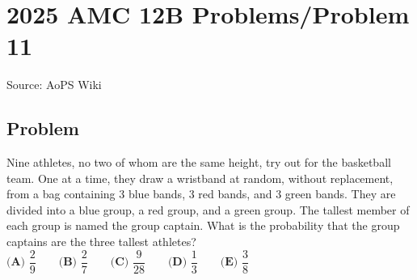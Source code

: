 \documentclass[12pt]{article}
\begin{document}
\section*{{2025 AMC 12B Problems/Problem 11}}
Source: AoPS Wiki

\subsection*{Problem}
Nine athletes, no two of whom are the same height, try out for the basketball team. One at a time, they draw a wristband at random, without replacement, from a bag containing 3 blue bands, 3 red bands, and 3 green bands. They are divided into a blue group, a red group, and a green group. The tallest member of each group is named the group captain. What is the probability that the group captains are the three tallest athletes? $\textbf{(A) } \dfrac{2}{9} \qquad \textbf{(B) } \dfrac{2}{7} \qquad \textbf{(C) } \dfrac{9}{28} \qquad \textbf{(D) } \dfrac{1}{3} \qquad \textbf{(E) } \dfrac{3}{8}$
\end{document}
